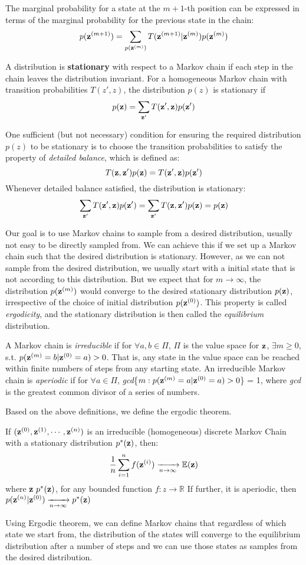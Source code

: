 The marginal probability for a state at the $m+1$-th position can be expressed in terms of the marginal probability for the previous state in the chain:
$$p({\bf z}^{(m+1)})=\sum_{p({\bf z}^{(m)})} T({\bf z}^{(m+1)}|{\bf z}^{(m)})p({\bf z}^{(m)})$$

A distribution is {\bf stationary} with respect to a Markov chain if each step in the chain leaves the distribution invariant. For a homogeneous Markov chain 
with transition probabilities $T(z',z)$, the distribution $p(z)$ is stationary if
$$p({\bf z}) = \sum_{{\bf z'}}T({\bf z'}, {\bf z})p({\bf z'})$$

One sufficient (but not necessary) condition for ensuring the required distribution $p(z)$ to be stationary is to choose the transition probabilities to satisfy the property
of {\it detailed balance}, which is defined as:
$$T({\bf z}, {\bf z'})p({\bf z}) = T({\bf z'}, {\bf z})p({\bf z'})$$
Whenever detailed balance satisfied, the distribution is stationary:
$$\sum_{{\bf z'}}T({\bf z'}, {\bf z})p({\bf z'}) = \sum_{{\bf z'}}T({\bf z}, {\bf z'})p({\bf z}) = p({\bf z})$$

Our goal is to use Markov chains to sample from a desired distribution, usually not easy to be directly sampled from. We can achieve this if we set up a Markov chain such that the desired distribution is stationary. However, as we can not 
sample from the desired distribution, we usually start with a initial state that is not according to this distribution.
But we expect that for $m \rightarrow \infty$, the distribution $p({\bf z}^{(m)})$ would converge to the desired stationary distribution $p({\bf z})$, irrespective of the choice of initial distribution $p({\bf z}^{(0)})$. This property is called {\it ergodicity}, and the stationary distribution is then called the {\it equilibrium} distribution.


A Markov chain is {\it irreducible} if for $\forall a, b\in \Pi$, $\Pi$ is the value space for ${\bf z}$, $\exists m\geq 0$, s.t. $p({\bf z}^{(m)}=b|{\bf z}^{(0)}=a)>0$. That is, any state in the value space can be reached within
finite numbers of steps from any starting state. An irreducible Markov chain is {\it aperiodic} if for $\forall a \in \Pi$, {\it gcd}\{$m:p({\bf z}^{(m)}=a|{\bf z}^{(0)}=a)>0$\} = 1, where {\it gcd} is the greatest common divisor of a series of numbers.


Based on the above definitions, we define the ergodic theorem.
\begin{theorem}
If $({\bf z}^{(0)},{\bf z}^{(1)},\cdots,{\bf z}^{(n)})$ is an irreducible (homogeneous) discrete Markov Chain with a stationary
distribution $p^{*}({\bf z})$, then: 
$$\frac{1}{n}\sum_{i=1}^{n}f({\bf z}^{(i)}) \xrightarrow[n\rightarrow \infty]{} \mathbb{E}({\bf z})$$ 
where ${\bf z}~ p^{*}({\bf z})$,
for any bounded function $f:z\rightarrow \mathbb{R}$ 
If further, it is aperiodic, then $p({\bf z}^{(n)}|{\bf z}^{(0)})\xrightarrow[n\rightarrow \infty]{} p^{*}({\bf z})$
\end{theorem}
Using Ergodic theorem, we can define Markov chains that regardless of which state we start from, the distribution of the states will converge to the equilibrium distribution after
a number of steps and we can use those states as samples from the desired distribution.

